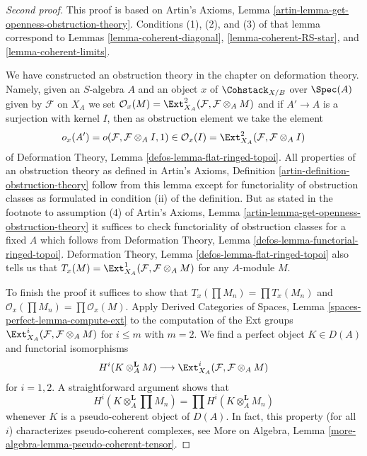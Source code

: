 \begin{proof}[Second proof]
This proof is based on
Artin's Axioms, Lemma \ref{artin-lemma-get-openness-obstruction-theory}.
Conditions (1), (2), and (3) of that lemma correspond to
Lemmas \ref{lemma-coherent-diagonal},
\ref{lemma-coherent-RS-star}, and
\ref{lemma-coherent-limits}.

\medskip\noindent
We have constructed an obstruction theory in the chapter on
deformation theory. Namely, given an $S$-algebra $A$ and an
object $x$ of $\Cohstack_{X/B}$ over $\Spec(A)$ given
by $\mathcal{F}$ on $X_A$ we set
$\mathcal{O}_x(M) = \Ext^2_{X_A}(\mathcal{F}, \mathcal{F} \otimes_A M)$
and if $A' \to A$ is a surjection with kernel $I$, then as obstruction
element we take the element
$$
o_x(A') = o(\mathcal{F}, \mathcal{F} \otimes_A I, 1) \in
\mathcal{O}_x(I) = \Ext^2_{X_A}(\mathcal{F}, \mathcal{F} \otimes_A I)
$$
of Deformation Theory, Lemma \ref{defos-lemma-flat-ringed-topoi}.
All properties of an obstruction theory as defined in
Artin's Axioms, Definition \ref{artin-definition-obstruction-theory}
follow from this lemma except for functoriality of obstruction classes
as formulated in condition (ii) of the definition. But as stated in
the footnote to assumption (4) of
Artin's Axioms, Lemma \ref{artin-lemma-get-openness-obstruction-theory}
it suffices to check functoriality of obstruction classes
for a fixed $A$ which follows from
Deformation Theory, Lemma \ref{defos-lemma-functorial-ringed-topoi}.
Deformation Theory, Lemma \ref{defos-lemma-flat-ringed-topoi}
also tells us that
$T_x(M) = \Ext^1_{X_A}(\mathcal{F}, \mathcal{F} \otimes_A M)$
for any $A$-module $M$.

\medskip\noindent
To finish the proof it suffices to show that
$T_x(\prod M_n) = \prod T_x(M_n)$ and
$\mathcal{O}_x(\prod M_n) = \prod \mathcal{O}_x(M)$.
Apply Derived Categories of Spaces, Lemma
\ref{spaces-perfect-lemma-compute-ext}
to the computation of the Ext groups
$\Ext^i_{X_A}(\mathcal{F}, \mathcal{F} \otimes_A M)$
for $i \leq m$ with $m = 2$. We find a perfect object $K \in D(A)$
and functorial isomorphisms
$$
H^i(K \otimes_A^\mathbf{L} M)
\longrightarrow
\Ext^i_{X_A}(\mathcal{F}, \mathcal{F} \otimes_A M)
$$
for $i = 1, 2$. A straightforward argument shows that
$$
H^i(K \otimes_A^\mathbf{L} \prod M_n) =
\prod H^i(K \otimes_A^\mathbf{L} M_n)
$$
whenever $K$ is a pseudo-coherent object of $D(A)$.
In fact, this property (for all $i$) characterizes
pseudo-coherent complexes, see
More on Algebra, Lemma \ref{more-algebra-lemma-pseudo-coherent-tensor}.
\end{proof}

